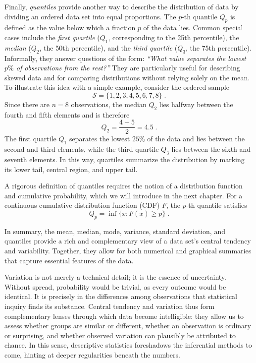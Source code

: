 \medskip

Finally, \textit{quantiles} provide another way to describe the distribution of data by dividing an ordered data set into equal proportions. The $p$-th quantile $Q_p$ is defined as the value below which a fraction $p$ of the data lies. Common special cases include the \textit{first quartile} ($Q_1$, corresponding to the 25th percentile), the \textit{median} ($Q_2$, the 50th percentile), and the \textit{third quartile} ($Q_3$, the 75th percentile). Informally, they answer questions of the form: \emph{“What value separates the lowest $p\%$ of observations from the rest?”} They are particularly useful for describing skewed data and for comparing distributions without relying solely on the mean. To illustrate this idea with a simple example, consider the ordered sample
\[
	\mathcal{S} = \{1, 2, 3, 4, 5, 6, 7, 8\} \; .
\]
Since there are $n = 8$ observations, the median $Q_2$ lies halfway between the fourth and fifth elements and is therefore
\[
	Q_2 = \frac{4 + 5}{2} = 4.5 \; .
\]
The first quartile $Q_1$ separates the lowest $25\%$ of the data and lies between the second and third elements, while the third quartile $Q_3$ lies between the sixth and seventh elements. In this way, quartiles summarize the distribution by marking its lower tail, central region, and upper tail.

\medskip

A rigorous definition of quantiles requires the notion of a distribution function and cumulative probability, which we will introduce in the next chapter. For a continuous cumulative distribution function (CDF) $F$, the $p$-th quantile satisfies
\begin{equation}
	Q_p = \inf \{ x : F(x) \ge p \} \; .
	\label{eq:quantiles}
\end{equation}

\medskip

In summary, the mean, median, mode, variance, standard deviation, and quantiles provide a rich and complementary view of a data set’s central tendency and variability. Together, they allow for both numerical and graphical summaries that capture essential features of the data.

\medskip

Variation is not merely a technical detail; it is the essence of uncertainty. Without spread, probability would be trivial, as every outcome would be identical. It is precisely in the differences among observations that statistical inquiry finds its substance. Central tendency and variation thus form complementary lenses through which data become intelligible: they allow us to assess whether groups are similar or different, whether an observation is ordinary or surprising, and whether observed variation can plausibly be attributed to chance. In this sense, descriptive statistics foreshadows the inferential methods to come, hinting at deeper regularities beneath the numbers.

